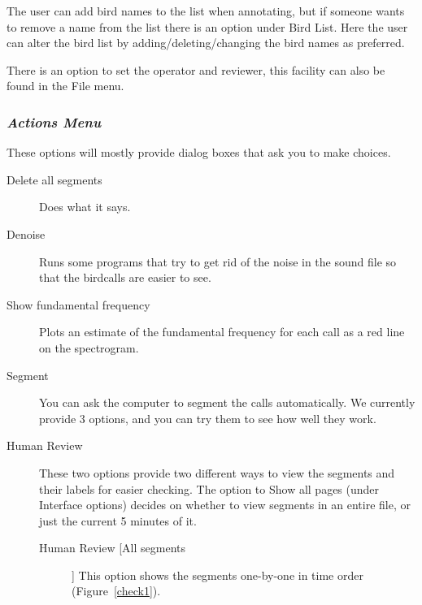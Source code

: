 \documentclass{article}
\begin{document}
\begin{description}
The user can add bird names to the list when annotating, but if someone wants to remove a name from the list there is an option under Bird List. Here the user can alter the bird list by adding/deleting/changing the bird names as preferred. 

There is an option to set the operator and reviewer, this facility can also be found in the File menu.
\end{description}

\subsubsection{{\em Actions Menu}}
\label{sec:action}

These options will mostly provide dialog boxes that ask you to make choices. 

\begin{description}
\item [Delete all segments] Does what it says. 
\item [Denoise] Runs some programs that try to get rid of the noise in the sound file so that the birdcalls are easier to see. 
\item [Show fundamental frequency] Plots an estimate of the fundamental frequency for each call as a red line on the spectrogram.
\item [Segment] You can ask the computer to segment the calls automatically. 
We currently provide 3 options, and you can try them to see how well they work.
\item [Human Review] These two options provide two different ways to view the segments and their labels for easier checking. The option to Show all pages (under Interface options) decides on whether to view segments in an entire file, or just the current 5 minutes of it. 
	\begin{description}
	\item [Human Review [All segments]] This option shows the segments one-by-one in time order (Figure~\ref{check1}).
	\begin{figure}
	\centering

\end{figure}
\end{description}
\end{description}
\end{document}
